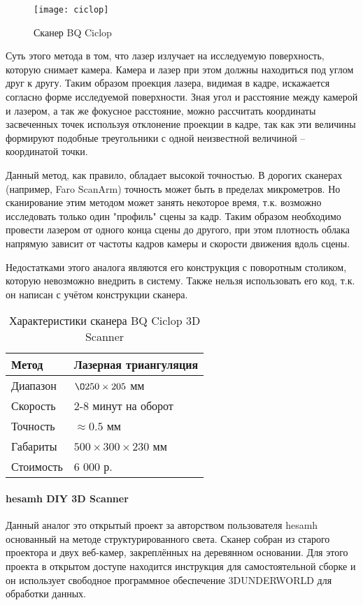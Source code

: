         \begin{figure}[H]
            \centering
            \texttt{[image: ciclop]}\label{pic:ciclop}
            \caption{Сканер BQ Ciclop}
        \end{figure}

        Суть этого метода в том, что лазер излучает на исследуемую поверхность, которую снимает камера. Камера и лазер при этом должны находиться под углом друг к другу. Таким образом проекция лазера, видимая в кадре, искажается согласно форме исследуемой поверхности. Зная угол и расстояние между камерой и лазером, а так же фокусное расстояние, можно рассчитать координаты засвеченных точек используя отклонение проекции в кадре, так как эти величины формируют подобные треугольники с одной неизвестной величиной -- координатой точки.

        Данный метод, как правило, обладает высокой точностью. В дорогих сканерах (например, Faro ScanArm) точность может быть в пределах микрометров. Но сканирование этим методом может занять некоторое время, т.к. возможно исследовать только один "профиль" сцены за кадр. Таким образом необходимо провести лазером от одного конца сцены до другого, при этом плотность облака напрямую зависит от частоты кадров камеры и скорости движения вдоль сцены.

        Недостатками этого аналога являются его конструкция с поворотным столиком, которую невозможно внедрить в систему. Также нельзя использовать его код, т.к. он написан с учётом конструкции сканера.

        \begin{table}[H]
            \centering
            \caption{Характеристики сканера BQ Ciclop 3D Scanner}\label{table:ciclop}
            \begin{tabular}{|l|l|}\hline
            Метод&Лазерная триангуляция\\ \hline
            Диапазон&$\O250 \times 205$ мм\\ \hline
            Скорость&2-8 минут на оборот\\ \hline
            Точность&$\approx 0.5$ мм\\ \hline
            Габариты&$ 500 \times 300 \times 230 $ мм\\ \hline
            Стоимость&6 000 р.\\ \hline
            \end{tabular}
        \end{table}

    \paragraph{hesamh DIY 3D Scanner}
        Данный аналог это открытый проект за авторством пользователя hesamh основанный на методе структурированного света\cite{hesamh}. Сканер собран из старого проектора и двух веб-камер, закреплённых на деревянном основании. Для этого проекта в открытом доступе находится инструкция для самостоятельной сборке и он использует свободное программное обеспечение 3DUNDERWORLD для обработки данных.

